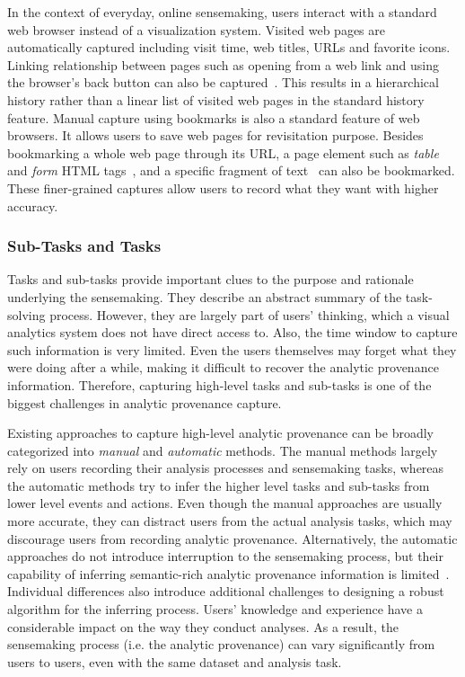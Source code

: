 In the context of everyday, online sensemaking, users interact with a standard web browser instead of a visualization system. Visited web pages are automatically captured including visit time, web titles, URLs and favorite icons. Linking relationship between pages such as opening from a web link and using the browser's back button can also be captured~\cite{Ayers1995,Hightower1998,Milic-Frayling2003}. This results in a hierarchical history rather than a linear list of visited web pages in the standard history feature. Manual capture using bookmarks is also a standard feature of web browsers. It allows users to save web pages for revisitation purpose. Besides bookmarking a whole web page through its URL, a page element such as \textit{table} and \textit{form} HTML tags~\cite{Hong2008}, and a specific fragment of text~\cite{Dontcheva2006} can also be bookmarked. These finer-grained captures allow users to record what they want with higher accuracy. 

\subsubsection{Sub-Tasks and Tasks}
Tasks and sub-tasks provide important clues to the purpose and rationale underlying the sensemaking. They describe an abstract summary of the task-solving process. However, they are largely part of users' thinking, which a visual analytics system does not have direct access to. Also, the time window to capture such information is very limited. Even the users themselves may forget what they were doing after a while, making it difficult to recover the analytic provenance information. Therefore, capturing high-level tasks and sub-tasks is one of the biggest challenges in analytic provenance capture.

Existing approaches to capture high-level analytic provenance can be broadly categorized into \emph{manual} and \emph{automatic} methods. The manual methods largely rely on users recording their analysis processes and sensemaking tasks, whereas the automatic methods try to infer the higher level tasks and sub-tasks from lower level events and actions. Even though the manual approaches are usually more accurate, they can distract users from the actual analysis tasks, which may discourage users from recording analytic provenance. Alternatively, the automatic approaches do not introduce interruption to the sensemaking process, but their capability of inferring semantic-rich analytic provenance information is limited~\cite{Gotz2009}. Individual differences also introduce additional challenges to designing a robust algorithm for the inferring process. Users' knowledge and experience have a considerable impact on the way they conduct analyses. As a result, the sensemaking process (i.e. the analytic provenance) can vary significantly from users to users, even with the same dataset and analysis task. 

